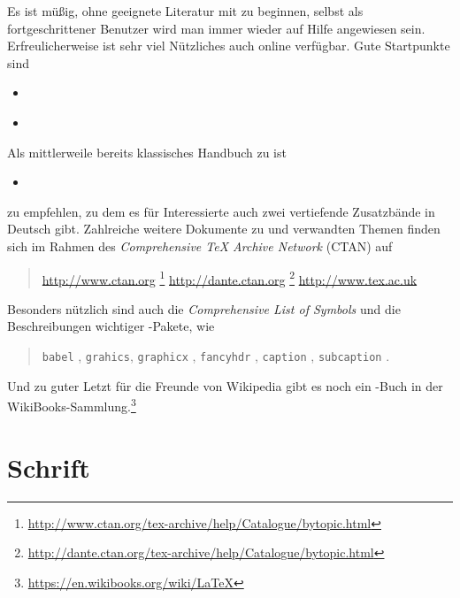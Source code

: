 Es ist müßig, ohne geeignete Literatur mit \latex zu beginnen, selbst
als fortgeschrittener Benutzer wird man immer wieder auf Hilfe angewiesen
sein. Erfreulicherweise ist sehr viel Nützliches auch online verfügbar.
Gute Startpunkte sind \zB
%
\begin{itemize}
\item \emph{}\cite{Schmidt01}
\item \emph{}\cite{Oetiker01}
\end{itemize}
%
\noindent
Als mittlerweile bereits klassisches Handbuch zu \latex ist
%
\begin{itemize}
  \item \emph{}\cite{Kopka98}
\end{itemize}
%
zu empfehlen, zu dem es für Interessierte auch zwei vertiefende
Zusatzbände in Deutsch gibt. Zahlreiche weitere Dokumente zu
\latex und verwandten Themen finden sich \ua im Rahmen des {\em
Comprehensive TeX Archive Network} (CTAN) auf
\begin{quote}
	\url{http://www.ctan.org}%
	\footnote{\url{http://www.ctan.org/tex-archive/help/Catalogue/bytopic.html}}\newline
	\url{http://dante.ctan.org}%
	\footnote{\url{http://dante.ctan.org/tex-archive/help/Catalogue/bytopic.html}}\newline
	\url{http://www.tex.ac.uk}
\end{quote}
%
Besonders nützlich sind auch die
\emph{Comprehensive List of {\rm \latex} Symbols} \cite{Pakin01}
und die Beschreibungen wichtiger \latex-Pakete, wie
%
\begin{quote}
	\texttt{babel} \cite{Braams2008},\newline
  \texttt{grahics}, \texttt{graphicx} \cite{Carlisle99},\newline
  \texttt{fancyhdr} \cite{Oostrum97},\newline
  \texttt{caption} \cite{Sommerfeldt07},\newline
  \texttt{subcaption} \cite{Cochran95}.
\end{quote}


Und zu guter Letzt für die Freunde von Wikipedia gibt es noch ein \latex-Buch in der WikiBooks-Sammlung.\footnote{\url{https://en.wikibooks.org/wiki/LaTeX}}


\section{Schrift}

